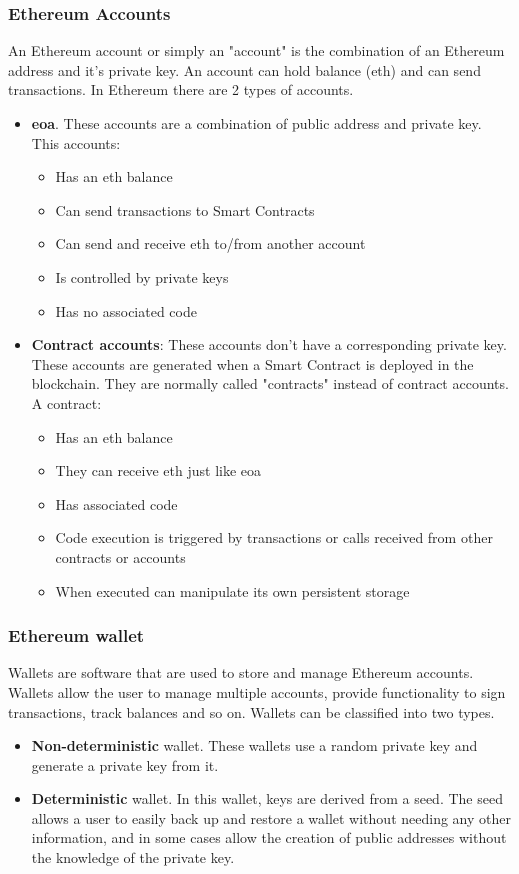 \subsubsection{Ethereum Accounts}
An Ethereum account or simply an "account" is the combination of an Ethereum address and it's private key. An account can hold balance (\acrlong{eth}) and can send transactions. In Ethereum there are 2 types of accounts.
\begin{itemize}
    \item \textbf{\acrfull{eoa}}. These accounts are a combination of public address and private key. This accounts:
          \begin{itemize}
              \item Has an \acrlong{eth} balance
              \item Can send transactions to Smart Contracts
              \item Can send and receive \acrlong{eth} to/from another account
              \item Is controlled by private keys
              \item Has no associated code
          \end{itemize}
    \item \textbf{Contract accounts}: These accounts don't have a corresponding private key. These accounts are generated when a Smart Contract is deployed in the blockchain. They are normally called "contracts" instead of contract accounts. A contract:
          \begin{itemize}
              \item Has an \acrlong{eth} balance
              \item They can receive \acrlong{eth} just like \acrshort{eoa}
              \item Has associated code
              \item Code execution is triggered by transactions or calls received from other contracts or accounts
              \item When executed can manipulate its own persistent storage
          \end{itemize}
\end{itemize}

\subsubsection{Ethereum wallet}
Wallets are software that are used to store and manage Ethereum accounts. Wallets allow the user to manage multiple accounts, provide functionality to sign transactions, track balances and so on. Wallets can be classified into two types.
\begin{itemize}
    \item \textbf{Non-deterministic} wallet. These wallets use a random private key and generate a private key from it.
    \item \textbf{Deterministic} wallet. In this wallet, keys are derived from a seed. The seed allows a user to easily back up and restore a wallet without needing any other information, and in some cases allow the creation of public addresses without the knowledge of the private key.
\end{itemize}

